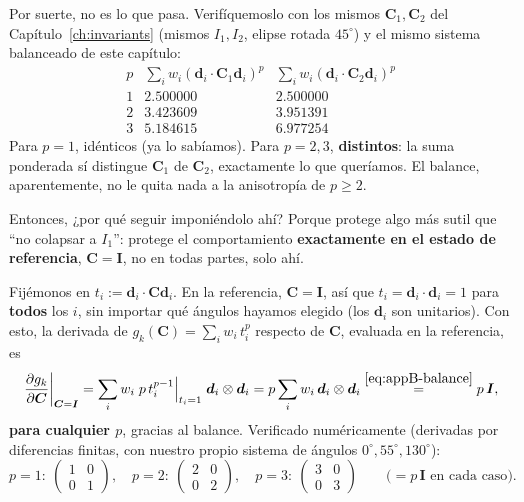 \documentclass[11pt,a4paper]{article}
\begin{document}
Por suerte, no es lo que pasa. Verif\'iquemoslo con los mismos
$\bm C_1,\bm C_2$ del Cap\'itulo~\ref{ch:invariants} (mismos
$I_1,I_2$, elipse rotada $45^\circ$) y el mismo sistema balanceado de
este cap\'itulo:
\[
 \begin{array}{c|cc}
 p & \sum_i w_i(\bm d_i\cdot\bm C_1\bm d_i)^p & \sum_i w_i(\bm d_i\cdot\bm C_2\bm d_i)^p\\\hline
 1 & 2.500000 & 2.500000\\
 2 & 3.423609 & 3.951391\\
 3 & 5.184615 & 6.977254
 \end{array}
\]
Para $p=1$, id\'enticos (ya lo sab\'iamos). Para $p=2,3$,
\textbf{distintos}: la suma ponderada s\'i distingue $\bm C_1$ de
$\bm C_2$, exactamente lo que quer\'iamos. El balance, aparentemente,
no le quita nada a la anisotrop\'ia de $p\geq2$.

Entonces, ¿por qu\'e seguir imponi\'endolo ah\'i? Porque protege algo
m\'as sutil que ``no colapsar a $I_1$'': protege el comportamiento
\textbf{exactamente en el estado de referencia}, $\bm C=\bm I$, no
en todas partes, solo ah\'i.

Fij\'emonos en $t_i:=\bm d_i\cdot\bm C\bm d_i$. En la referencia,
$\bm C=\bm I$, as\'i que $t_i=\bm d_i\cdot\bm d_i=1$ para
\textbf{todos} los $i$, sin importar qu\'e \'angulos hayamos elegido
(los $\bm d_i$ son unitarios). Con esto, la derivada de
$g_k(\bm C)=\sum_i w_i\,t_i^p$ respecto de $\bm C$, evaluada en la
referencia, es
\[
 \left.\frac{\partial g_k}{\partial\bm C}\right|_{\bm C=\bm I}
 =\sum_i w_i\;p\,t_i^{p-1}\Big|_{t_i=1}\;\bm d_i\otimes\bm d_i
 =p\sum_i w_i\,\bm d_i\otimes\bm d_i
 \overset{\eqref{eq:appB-balance}}{=}p\,\bm I,
\]
\textbf{para cualquier $p$}, gracias al balance. Verificado
num\'ericamente (derivadas por diferencias finitas, con nuestro propio
sistema de \'angulos $0^\circ,55^\circ,130^\circ$):
\[
 p=1:\ \begin{pmatrix}1&0\\0&1\end{pmatrix},\quad
 p=2:\ \begin{pmatrix}2&0\\0&2\end{pmatrix},\quad
 p=3:\ \begin{pmatrix}3&0\\0&3\end{pmatrix}
 \qquad\Big(=p\,\bm I\text{ en cada caso}\Big).
\]
\end{document}
